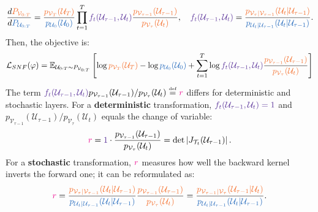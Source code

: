 \begin{equation}
    \frac{d\textcolor{Orange}{P_{\mathcal{V}_{0:T}}}}{d\textcolor{NavyBlue}{P_{\mathcal{U}_{0:T}}}} = \frac{\textcolor{Orange}{p_{\mathcal{V}_T}(\mathcal{U}_T)}}{\textcolor{NavyBlue}{p_{\mathcal{U}_0}(\mathcal{U}_0)}}\prod_{t=1}^{T}\textcolor{RoyalPurple}{f_t(\mathcal{U}_{\tau-1}, \mathcal{U}_t)}\frac{\textcolor{Orange}{p_{\mathcal{V}_{\tau-1}}(\mathcal{U}_{\tau-1})}}{\textcolor{Orange}{p_{\mathcal{V}_\tau}(\mathcal{U}_t)}}, \quad \textcolor{RoyalPurple}{f_t(\mathcal{U}_{\tau-1}, \mathcal{U}_t)}=\frac{\textcolor{Orange}{p_{\mathcal{V}_\tau|\mathcal{V}_{\tau-1}}(\mathcal{U}_t|\mathcal{U}_{\tau-1})}}{\textcolor{NavyBlue}{p_{\mathcal{U}_t|\mathcal{U}_{\tau-1}}(\mathcal{U}_t|\mathcal{U}_{\tau-1})}}.
\end{equation}
Then, the objective is:
\begin{equation}
    \mathcal{L}_{SNF}(\varphi) = \mathbb{E}_{\mathcal{U}_{0:T}\sim P_{\mathcal{V}_{0:T}}}\left[\log \textcolor{Orange}{p_{\mathcal{V}_T}(\mathcal{U}_T)} - \log \textcolor{NavyBlue}{p_{\mathcal{U}_0}(\mathcal{U}_0)} + \sum_{t=1}^{T} \log \textcolor{RoyalPurple}{f_t(\mathcal{U}_{\tau-1}, \mathcal{U}_t)}\frac{\textcolor{Orange}{p_{\mathcal{V}_{\tau-1}}(\mathcal{U}_{\tau-1})}}{\textcolor{Orange}{p_{\mathcal{V}_\tau}(\mathcal{U}_t)}}\right]
\end{equation}
The term $\textcolor{RoyalPurple}{f_t(\mathcal{U}_{\tau-1}, \mathcal{U}_t)}p_{\mathcal{V}_{\tau-1}}(\mathcal{U}_{\tau-1})/p_{\mathcal{V}_\tau}(\mathcal{U}_t)\overset{\underset{\mathrm{def}}{}}{=}\textcolor{Magenta}{r}$ differs for deterministic and stochastic layers. For a \textbf{deterministic} transformation, $\textcolor{RoyalPurple}{f_t(\mathcal{U}_{\tau-1}, \mathcal{U}_t)=1}$ and $p_{\mathcal{V}_{\tau-1}}(\mathcal{U}_{\tau-1})/p_{\mathcal{V}_\tau}(\mathcal{U}_t)$ equals the change of variable:
\begin{equation}
    \textcolor{Magenta}{r} = \textcolor{RoyalPurple}{1}\cdot \frac{p_{\mathcal{V}_{\tau-1}}(\mathcal{U}_{\tau-1})}{p_{\mathcal{V}_\tau}(\mathcal{U}_t)} = \det \left|J_{\mathcal{T}_t}(\mathcal{U}_{\tau-1})\right|.
\end{equation}
For a \textbf{stochastic} transformation, $\textcolor{Magenta}{r}$ measures how well the backward kernel inverts the forward one; it can be reformulated as:
\begin{equation}
    \textcolor{Magenta}{r} = \frac{\textcolor{Orange}{p_{\mathcal{V}_\tau|\mathcal{V}_{\tau-1}}(\mathcal{U}_t|\mathcal{U}_{\tau-1})}}{\textcolor{NavyBlue}{p_{\mathcal{U}_t|\mathcal{U}_{\tau-1}}(\mathcal{U}_t|\mathcal{U}_{\tau-1})}}\frac{\textcolor{Orange}{p_{\mathcal{V}_{\tau-1}}(\mathcal{U}_{\tau-1})}}{\textcolor{Orange}{p_{\mathcal{V}_\tau}(\mathcal{U}_t)}} = \frac{\textcolor{Orange}{p_{\mathcal{V}_{\tau-1}|\mathcal{V}_\tau}(\mathcal{U}_{\tau-1}|\mathcal{U}_t)}}{\textcolor{NavyBlue}{p_{\mathcal{U}_t|\mathcal{U}_{\tau-1}}(\mathcal{U}_t|\mathcal{U}_{\tau-1})}}.
\end{equation}
